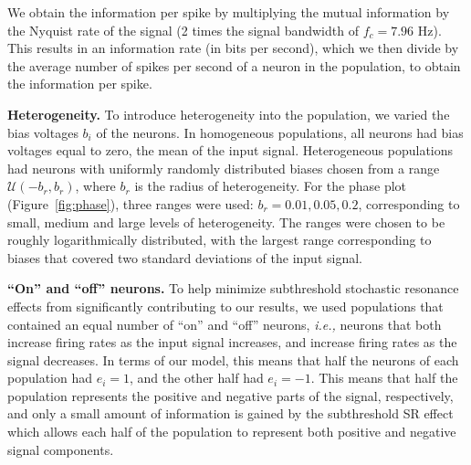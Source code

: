 \documentclass[12pt]{article}
\begin{document}
We obtain the information per spike by multiplying the mutual information by the Nyquist rate of the signal (2 times the signal bandwidth of $f_c = 7.96$ Hz). This results in an information rate (in bits per second), which we then divide by the average number of spikes per second of a neuron in the population, to obtain the information per spike.

\textbf{Heterogeneity.} To introduce heterogeneity into the population, we varied the bias voltages $b_i$ of the neurons. In homogeneous populations, all neurons had bias voltages equal to zero, the mean of the input signal. Heterogeneous populations had neurons with uniformly randomly distributed biases chosen from a range $\mathcal{U}(-b_r, b_r)$, where $b_r$ is the radius of heterogeneity. For the phase plot (Figure~\ref{fig:phase}), three ranges were used: $b_r = 0.01, 0.05, 0.2$, corresponding to small, medium and large levels of heterogeneity. The ranges were chosen to be roughly logarithmically distributed, with the largest range corresponding to biases that covered two standard deviations of the input signal.

\textbf{``On'' and ``off'' neurons.} To help minimize subthreshold stochastic resonance effects from significantly contributing to our results, we used populations that contained an equal number of ``on'' and ``off'' neurons, \emph{i.e.,} neurons that both increase firing rates as the input signal increases, and increase firing rates as the signal decreases. In terms of our model, this means that half the neurons of each population had $e_i = 1$, and the other half had $e_i = -1$. This means that half the population represents the positive and negative parts of the signal, respectively, and only a small amount of information is gained by the subthreshold SR effect which allows each half of the population to represent both positive and negative signal components.
\end{document}
